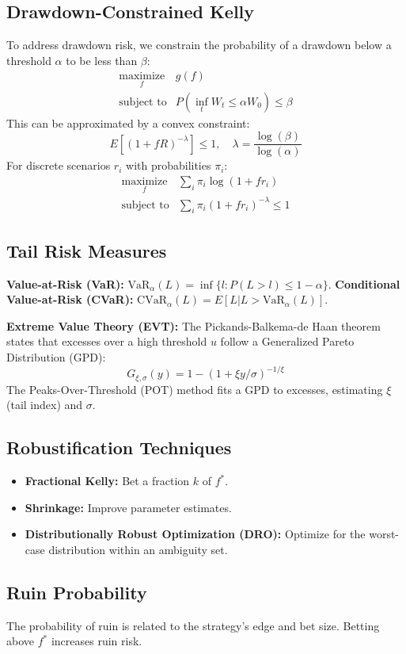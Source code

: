 \documentclass{article}
\begin{document}
\subsection{Drawdown-Constrained Kelly}
To address drawdown risk, we constrain the probability of a drawdown below a threshold $\alpha$ to be less than $\beta$:
$$ \begin{array}{ll}
\underset{f}{\text{maximize}} & g(f) \\
\text{subject to} & P(\inf_t W_t \le \alpha W_0) \le \beta
\end{array} $$
This can be approximated by a convex constraint:
$$ E[(1+fR)^{-\lambda}] \le 1, \quad \lambda = \frac{\log(\beta)}{\log(\alpha)} $$
For discrete scenarios $r_i$ with probabilities $\pi_i$:
$$ \begin{array}{ll}
\underset{f}{\text{maximize}} & \sum_i \pi_i \log(1+fr_i) \\
\text{subject to} & \sum_i \pi_i (1+fr_i)^{-\lambda} \le 1
\end{array} $$

\subsection{Tail Risk Measures}
\textbf{Value-at-Risk (VaR):}  $\text{VaR}_{\alpha}(L) = \inf\{l : P(L > l) \le 1-\alpha \}$.
\textbf{Conditional Value-at-Risk (CVaR):} $\text{CVaR}_{\alpha}(L) = E[L | L > \text{VaR}_{\alpha}(L)]$.

\textbf{Extreme Value Theory (EVT):} The Pickands-Balkema-de Haan theorem states that excesses over a high threshold $u$ follow a Generalized Pareto Distribution (GPD):
$$G_{\xi, \sigma}(y) = 1 - (1 + \xi y/\sigma)^{-1/\xi}$$
The Peaks-Over-Threshold (POT) method fits a GPD to excesses, estimating $\xi$ (tail index) and $\sigma$.

\subsection{Robustification Techniques}
\begin{itemize}
    \item \textbf{Fractional Kelly:}  Bet a fraction $k$ of $f^*$.
    \item \textbf{Shrinkage:} Improve parameter estimates.
    \item \textbf{Distributionally Robust Optimization (DRO):} Optimize for the worst-case distribution within an ambiguity set.
\end{itemize}

\subsection{Ruin Probability}
The probability of ruin is related to the strategy's edge and bet size.  Betting above $f^*$ increases ruin risk.
\end{document}

